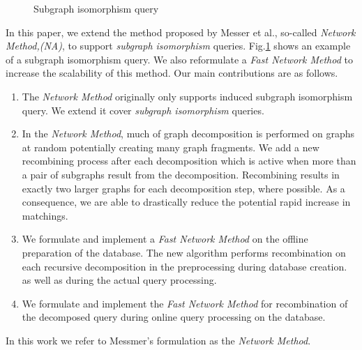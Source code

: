 \begin{figure}
\centering

\caption{Subgraph isomorphism query}
\label{fig:fig11}
\end{figure}


In this paper, we extend the method proposed by Messer et al.\cite{messmer_bunke2000}, so-called \textit{Network Method,(NA)}, to support \textit{subgraph isomorphism} queries.
Fig.\ref{fig:fig11} shows an example of a subgraph isomorphism query. We also reformulate a  \textit{Fast Network Method } to increase the scalability of this method.
Our main contributions are as follows.

\begin{enumerate}
\item The \textit{Network Method} originally only supports induced subgraph isomorphism query. We extend it  cover \textit{subgraph isomorphism} queries.
\item  In the \textit{Network Method}, much of graph decomposition is performed on graphs at random potentially creating many graph fragments. We add a new recombining 
process after each decomposition which is active when more than a pair of  subgraphs result from the decomposition.  Recombining results in exactly  two larger 
graphs for each decomposition step, where possible.  As a consequence, we are able to drastically reduce the potential rapid increase in matchings. 
\item We formulate and implement  a  \textit{Fast Network Method} on the offline preparation of the database. The new algorithm performs recombination 
on  each recursive decomposition in the  preprocessing during database creation. as well as during the actual query processing. 
\item We formulate and implement the \textit{Fast Network Method} for recombination of the decomposed query during  online query processing on the database.
\end{enumerate}

In this work we refer to Messmer's formulation as the \textit{Network Method}.


